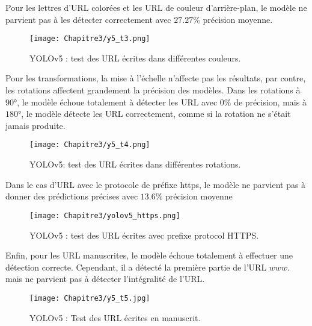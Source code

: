           Pour les lettres d'URL colorées et les URL de couleur d'arrière-plan, le modèle ne parvient pas à les détecter correctement avec $27.27\%$ précision moyenne.
          \begin{figure}[H]
                    \centering
                    \texttt{[image: Chapitre3/y5\_t3.png]}
                    \caption{YOLOv5 : test des URL écrites dans différentes couleurs.}
                    \label{y5_t3}
                    \end{figure}

          Pour les transformations, la mise à l'échelle n'affecte pas les résultats, par contre, les rotations affectent grandement la précision des modèles. Dans les rotations à $90 °$, le modèle échoue totalement à détecter les URL avec $0\%$ de précision, mais à $180 °$, le modèle détecte les URL correctement, comme si la rotation ne s'était jamais produite.
          \begin{figure}[H]
                    \centering
                    \texttt{[image: Chapitre3/y5\_t4.png]}
                    \caption{YOLOv5: test des URL écrites dans différentes rotations.}
                    \label{y5_t4}
                    \end{figure}
               
          Dans le cas d'URL avec le protocole de préfixe https, le modèle ne parvient pas à donner des prédictions précises avec $13.6\%$ précision moyenne
          \begin{figure}[H]
                    \centering
                    \texttt{[image: Chapitre3/yolov5\_https.png]}
                    \caption{YOLOv5 : test des URL écrites avec prefixe protocol HTTPS.}
                    \label{y5_https}
                    \end{figure}
               

          Enfin, pour les URL manuscrites, le modèle échoue totalement à effectuer une détection correcte. Cependant, il a détecté la première partie de l'URL $www.$ mais ne parvient pas à détecter l'intégralité de l'URL.
          \begin{figure}[H]
                    \centering
                    \texttt{[image: Chapitre3/y5\_t5.jpg]}
                    \caption{YOLOv5 : Test des URL écrites en manuscrit.}
                    \label{y5_t5}
                    \end{figure}

